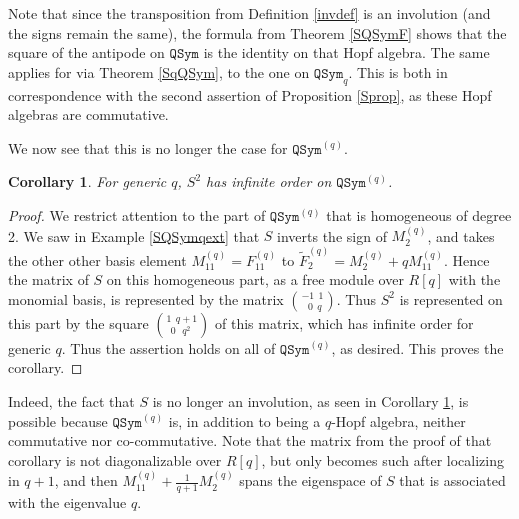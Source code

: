 \documentclass{article}
\newtheorem{cor}[thm]{Corollary}
\theoremstyle{definition}
\begin{document}
\medskip

Note that since the transposition from Definition \ref{invdef} is an involution (and the signs remain the same), the formula from Theorem \ref{SQSymF} shows that the square of the antipode on $\mathtt{QSym}$ is the identity on that Hopf algebra. The same applies for via Theorem \ref{SqQSym}, to the one on $\mathtt{QSym}_{q}$. This is both in correspondence with the second assertion of Proposition \ref{Sprop}, as these Hopf algebras are commutative.

We now see that this is no longer the case for $\mathtt{QSym}^{(q)}$.
\begin{cor}
For generic $q$, $S^{2}$ has infinite order on $\mathtt{QSym}^{(q)}$. \label{deg2QSymq}
\end{cor}

\begin{proof}
We restrict attention to the part of $\mathtt{QSym}^{(q)}$ that is homogeneous of degree 2. We saw in Example \ref{SQSymqext} that $S$ inverts the sign of $M_{2}^{(q)}$, and takes the other other basis element $M_{11}^{(q)}=F_{11}^{(q)}$ to $\widetilde{F}_{2}^{(q)}=M_{2}^{(q)}+qM_{11}^{(q)}$. Hence the matrix of $S$ on this homogeneous part, as a free module over $R[q]$ with the monomial basis, is represented by the matrix $\binom{-1\ \ 1}{\ \ 0\ \ q}$. Thus $S^{2}$ is represented on this part by the square $\binom{1\ \ q+1}{0\ \ \ q^{2}\ }$ of this matrix, which has infinite order for generic $q$. Thus the assertion holds on all of $\mathtt{QSym}^{(q)}$, as desired. This proves the corollary.
\end{proof}
Indeed, the fact that $S$ is no longer an involution, as seen in Corollary \ref{deg2QSymq}, is possible because $\mathtt{QSym}^{(q)}$ is, in addition to being a $q$-Hopf algebra, neither commutative nor co-commutative. Note that the matrix from the proof of that corollary is not diagonalizable over $R[q]$, but only becomes such after localizing in $q+1$, and then $M_{11}^{(q)}+\frac{1}{q+1}M_{2}^{(q)}$ spans the eigenspace of $S$ that is associated with the eigenvalue $q$.
\end{document}
